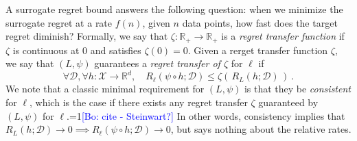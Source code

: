 \documentclass{article}
\theoremstyle{definition}\newtheorem{definition}{Definition}
\theoremstyle{definition}\newtheorem{assumption}{Assumption}
\newcommand{\Comments}{1}
\newcommand{\mynote}[2]{\ifnum\Comments=1\textcolor{#1}{#2}\fi}
\newcommand{\raf}[1]{\mynote{green}{[RF: #1]}}
\newcommand{\bo}[1]{\mynote{blue}{[Bo: #1]}}
\newcommand{\reals}{\mathbb{R}}
\newcommand{\D}{\mathcal{D}}
\newcommand{\X}{\mathcal{X}}
\begin{document}
A surrogate regret bound answers the following question: when we minimize the surrogate regret at a rate $f(n)$, given $n$ data points, how fast does the target regret diminish?
Formally, we say that $\zeta : \reals_+ \to \reals_+$ is a \emph{regret transfer function} if $\zeta$ is continuous at $0$ and satisfies $\zeta(0) = 0$.
Given a rerget transfer function $\zeta$, we say that $(L,\psi)$ guarantees a \emph{regret transfer of $\zeta$} for $\ell$ if
\begin{equation}
  \label{eq:surrogate-regret-bound}
  \forall \D, \forall h:\X\to\reals^d, \quad R_\ell(\psi\circ h;\D) \leq \zeta(\, R_L(h;\D) \,)~.
\end{equation}
We note that a classic minimal requirement for $(L,\psi)$ is that they be \emph{consistent} for $\ell$, which is the case if there exists any regret transfer $\zeta$ guaranteed by $(L,\psi)$ for $\ell$.\bo{cite - Steinwart?}
In other words, consistency implies that $R_L(h;\D) \to 0 \implies R_{\ell}(\psi \circ h;\D) \to 0$, but says nothing about the relative rates.


\end{document}
